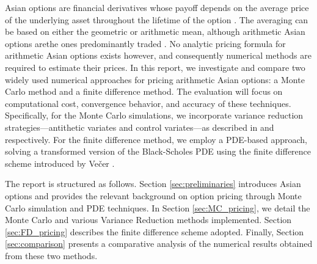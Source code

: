 Asian options are financial derivatives whose payoff depends on the average price of the underlying asset throughout the 
lifetime of the option \cite{hull2016options}.
The averaging can be based on either the geometric or arithmetic mean, although arithmetic
Asian options arethe ones predominantly traded \cite{kemna1990pricing}. No analytic pricing formula 
for arithmetic Asian options exists however, and consequently numerical methods are required
to estimate their prices.
In this report, we investigate and compare two widely used numerical approaches for pricing
arithmetic Asian options: a Monte Carlo method and a finite difference method. The evaluation
will focus on computational cost, convergence behavior, and accuracy of these techniques. 
Specifically, for the Monte Carlo simulations, we incorporate variance reduction strategies—antithetic 
variates and control variates—as described in \cite{hull2016options} and \cite{kemna1990pricing} respectively. 
For the finite difference method, we employ a PDE-based approach, solving a transformed version of 
the Black-Scholes PDE using the finite difference scheme introduced by Večer \cite{vecer2001new}.

The report is structured as follows. Section \ref{sec:preliminaries} introduces Asian options and 
provides the relevant background on option pricing through Monte Carlo simulation and PDE techniques. 
In Section \ref{sec:MC_pricing}, we detail the Monte Carlo and various Variance Reduction methods implemented. Section \ref{sec:FD_pricing}
describes the finite difference scheme adopted. Finally, Section \ref{sec:comparison} presents a comparative analysis of the numerical results
obtained from these two methods.

